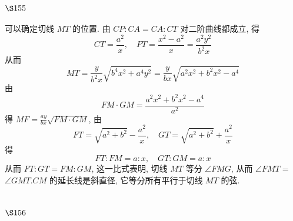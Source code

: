 \section{$\S 155$}

可以确定切线 $M T$ 的位置. 由 $C P: C A=C A: C T$ 对二阶曲线都成立, 得
\[
C T=\frac{a^{2}}{x}, \quad P T=\frac{x^{2}-a^{2}}{x}=\frac{a^{2} y^{2}}{b^{2} x}
\]
从而
\[
M T=\frac{y}{b^{2} x} \sqrt{b^{4} x^{2}+a^{4} y^{2}}=\frac{y}{b x} \sqrt{a^{2} x^{2}+b^{2} x^{2}-a^{4}}
\]
由
\[
F M \cdot G M=\frac{a^{2} x^{2}+b^{2} x^{2}-a^{4}}{a^{2}}
\]
得 $M F=\frac{a y}{b x} \sqrt{F M \cdot G M}$, 由
\[
F T=\sqrt{a^{2}+b^{2}}-\frac{a^{2}}{x}, \quad G T=\sqrt{a^{2}+b^{2}}+\frac{a^{2}}{x}
\]
得
\[
F T: F M=a: x, \quad G T: G M=a: x
\]
从而 $F T: G T=F M: G M$, 这一比式表明, 切线 $M T$ 等分 $\angle F M G$, 从而 $\angle F M T=$ $\angle G M T . C M$ 的延长线是斜直径, 它等分所有平行于切线 $M T$ 的弦. 

\section{$\S 156$}

